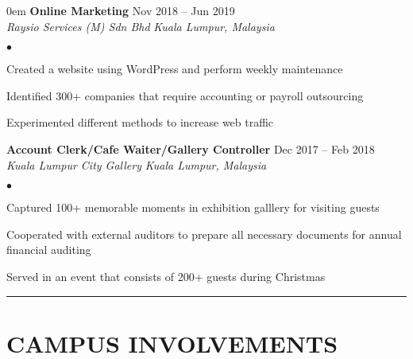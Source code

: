 \documentclass{article}
\newenvironment{list2}{
  \begin{list}{\tiny$\bullet$}{%
      \setlength{\itemsep}{-1em}
      \setlength{\parsep}{0in} \setlength{\parskip}{0in}
      \setlength{\topsep}{0in} \setlength{\partopsep}{0in}
      \setlength{\leftmargin}{.25in}}}{\end{list}}
\begin{document}
\begin{addmargin}[2em]{0em}
{\flushleft \bf Online Marketing} \hfill{Nov 2018 -- Jun 2019}\\
{\textit{Raysio Services (M) Sdn Bhd}} \hfill \textit{Kuala Lumpur, Malaysia}\\
\vspace{-.3cm}
\begin{list2}
\item Created a website using WordPress and perform weekly maintenance\\
\item Identified 300+ companies that require accounting or payroll outsourcing\\
\item Experimented different methods to increase web traffic 

\end{list2}

\vspace{-.2em}

{\flushleft\bf Account Clerk/Cafe Waiter/Gallery Controller} \hfill{Dec 2017 -- Feb 2018}\\
\textit{Kuala Lumpur City Gallery} \hfill \textit{Kuala Lumpur, Malaysia}\\
\vspace{-.3cm}
\begin{list2}
\item Captured 100+ memorable moments in exhibition galllery for visiting guests\\
\item Cooperated with external auditors to prepare all necessary documents for annual financial auditing\\
\item Served in an event that consists of 200+ guests during Christmas

\end{list2}
\end{addmargin}

\vspace{0em}
\noindent\rule[0.5ex]{\linewidth}{1pt}
\vspace{-1.5em}
\section{CAMPUS INVOLVEMENTS}
\end{document}
